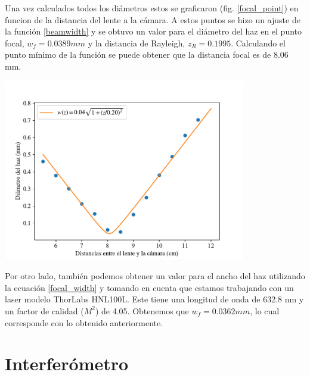 \documentclass[onecolumn]{article}
\begin{document}
		Una vez calculados todos los diámetros estos se graficaron (fig. \ref{focal_point}) en funcion de la distancia del lente a la cámara. A estos puntos se hizo un ajuste de la función \ref{beamwidth} y se obtuvo un valor para el diámetro del haz en el punto focal, $w_f=0.0389 mm$ y la distancia de Rayleigh, $z_R=0.1995$. Calculando el punto mínimo de la función se puede obtener que la distancia focal es de 8.06 mm.

		\begin{center}
			\includegraphics[width=300pt]{img/dist_focal/focal_point.pdf}
			\label{focal_point}
		\end{center}

		Por otro lado, también podemos obtener un valor para el ancho del haz utilizando la ecuación \ref{focal_width} y tomando en cuenta que estamos trabajando con un laser modelo ThorLabs HNL100L. Este tiene una longitud de onda de 632.8 nm y un factor de calidad ($M^2$) de 4.05. Obtenemos que $w_f=0.0362 mm$, lo cual corresponde con lo obtenido anteriormente.

	\section{Interferómetro}
\end{document}
